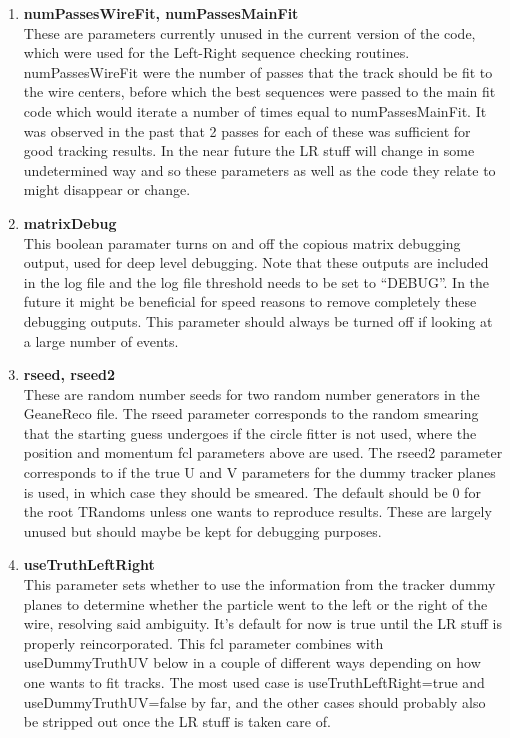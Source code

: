 \documentclass{article}
\begin{document}
\begin{enumerate}
      \item{\bf{numPassesWireFit, numPassesMainFit}} \\
      These are parameters currently unused in the current version of the code, which were used for the Left-Right sequence checking routines. numPassesWireFit were the number of passes that the track should be fit to the wire centers, before which the best sequences were passed to the main fit code which would iterate a number of times equal to numPassesMainFit. It was observed in the past that 2 passes for each of these was sufficient for good tracking results. In the near future the LR stuff will change in some undetermined way and so these parameters as well as the code they relate to might disappear or change.

      \item{\bf{matrixDebug}} \\
      This boolean paramater turns on and off the copious matrix debugging output, used for deep level debugging. Note that these outputs are included in the log file and the log file threshold needs to be set to ``DEBUG''. In the future it might be beneficial for speed reasons to remove completely these debugging outputs. This parameter should always be turned off if looking at a large number of events.

      \item{\bf{rseed, rseed2}} \\
      These are random number seeds for two random number generators in the GeaneReco file. The rseed parameter corresponds to the random smearing that the starting guess undergoes if the circle fitter is not used, where the position and momentum fcl parameters above are used. The rseed2 parameter corresponds to if the true U and V parameters for the dummy tracker planes is used, in which case they should be smeared. The default should be 0 for the root TRandoms unless one wants to reproduce results. These are largely unused but should maybe be kept for debugging purposes.

      \item{\bf{useTruthLeftRight}} \\
      This parameter sets whether to use the information from the tracker dummy planes to determine whether the particle went to the left or the right of the wire, resolving said ambiguity. It's default for now is true until the LR stuff is properly reincorporated. This fcl parameter combines with useDummyTruthUV below in a couple of different ways depending on how one wants to fit tracks. The most used case is useTruthLeftRight=true and useDummyTruthUV=false by far, and the other cases should probably also be stripped out once the LR stuff is taken care of.


\end{enumerate}
\end{document}

